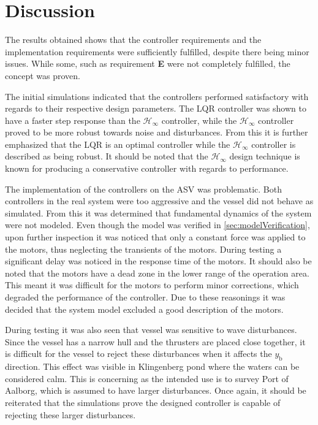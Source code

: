 \chapter{Discussion}\label{chap:discussion}

The results obtained shows that the controller requirements and the implementation requirements were sufficiently fulfilled, despite there being minor issues. While some, such as requirement \textbf{E} were not completely fulfilled, the concept was proven.

The initial simulations indicated that the controllers performed satisfactory with regards to their respective design parameters. The LQR controller was shown to have a faster step response than the $\mathcal{H}_\infty$ controller, while the $\mathcal{H}_\infty$ controller proved to be more robust towards noise and disturbances. From this it is further emphasized that the LQR is an optimal controller while the $\mathcal{H}_\infty$ controller is described as being robust. It should be noted that the $\mathcal{H}_\infty$ design technique is known for producing a conservative controller with regards to performance.

The implementation of the controllers on the ASV was problematic. Both controllers in the real system were too aggressive and the vessel did not behave as simulated. From this it was determined that fundamental dynamics of the system were not modeled. Even though the model was verified in \autoref{sec:modelVerification}, upon further inspection it was noticed that only a constant force was applied to the motors, thus neglecting the transients of the motors. During testing a significant delay was noticed in the response time of the motors. It should also be noted that the motors have a dead zone in the lower range of the operation area. This meant it was difficult for the motors to perform minor corrections, which degraded the performance of the controller. Due to these reasonings it was decided that the system model excluded a good description of the motors. 

During testing it was also seen that vessel was sensitive to wave disturbances. Since the vessel has a narrow hull and the thrusters are placed close together, it is difficult for the vessel to reject these disturbances when it affects the $y_\mathrm{b}$ direction. This effect was visible in Klingenberg pond where the waters can be considered calm. This is concerning as the intended use is to survey Port of Aalborg, which is assumed to have larger disturbances. Once again, it should be reiterated that the simulations prove the designed controller is capable of rejecting these larger disturbances.

